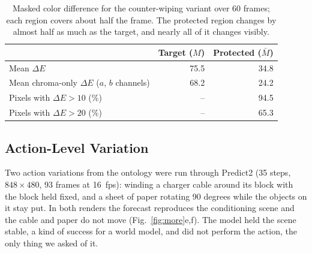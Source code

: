 \begin{table}[t]
\centering
\caption{Masked color difference for the counter-wiping variant over 60 frames; each region covers about half the frame. The protected region changes by almost half as much as the target, and nearly all of it changes visibly.}
\label{tab:leakage}
\small
\begin{tabular}{@{}lrr@{}}
\toprule
 & Target ($M$) & Protected ($\bar M$) \\
\midrule
Mean $\Delta E$ & 75.5 & 34.8 \\
Mean chroma-only $\Delta E$ ($a$, $b$ channels) & 68.2 & 24.2 \\
Pixels with $\Delta E > 10$ (\%) & -- & 94.5 \\
Pixels with $\Delta E > 20$ (\%) & -- & 65.3 \\
\bottomrule
\end{tabular}
\end{table}

\subsection{Action-Level Variation}
\label{sec:action}
Two action variations from the ontology were run through Predict2 (35 steps, $848\times480$, 93 frames at 16~fps): winding a charger cable around its block with the block held fixed, and a sheet of paper rotating 90 degrees while the objects on it stay put. In both renders the forecast reproduces the conditioning scene and the cable and paper do not move (Fig.~\ref{fig:more}e,f). The model held the scene stable, a kind of success for a world model, and did not perform the action, the only thing we asked of it.
